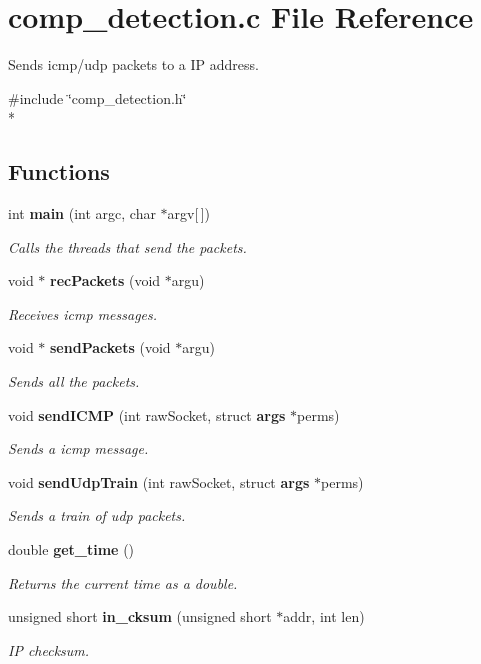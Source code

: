 \section{comp\-\_\-detection.\-c File Reference}
\label{comp__detection_8c}


Sends icmp/udp packets to a I\-P address.  


{\ttfamily \#include \char`\"{}comp\-\_\-detection.\-h\char`\"{}}\\*
\subsection*{Functions}
\begin{DoxyCompactItemize}
\item 
int {\bf main} (int argc, char $\ast$argv[$\,$])
\begin{DoxyCompactList}\small\item\em Calls the threads that send the packets. \end{DoxyCompactList}\item 
void $\ast$ {\bf rec\-Packets} (void $\ast$argu)
\begin{DoxyCompactList}\small\item\em Receives icmp messages. \end{DoxyCompactList}\item 
void $\ast$ {\bf send\-Packets} (void $\ast$argu)
\begin{DoxyCompactList}\small\item\em Sends all the packets. \end{DoxyCompactList}\item 
void {\bf send\-I\-C\-M\-P} (int raw\-Socket, struct {\bf args} $\ast$perms)
\begin{DoxyCompactList}\small\item\em Sends a icmp message. \end{DoxyCompactList}\item 
void {\bf send\-Udp\-Train} (int raw\-Socket, struct {\bf args} $\ast$perms)
\begin{DoxyCompactList}\small\item\em Sends a train of udp packets. \end{DoxyCompactList}\item 
double {\bf get\-\_\-time} ()
\begin{DoxyCompactList}\small\item\em Returns the current time as a double. \end{DoxyCompactList}\item 
unsigned short {\bf in\-\_\-cksum} (unsigned short $\ast$addr, int len)
\begin{DoxyCompactList}\small\item\em I\-P checksum. \end{DoxyCompactList}\end{DoxyCompactItemize}


